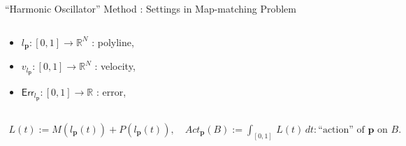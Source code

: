 \documentclass[aspectratio=169, bigfiles]{beamer}
\newcommand{\err}{\mathsf{Err}}
\newcommand{\R}{\mathbb{R}}
\begin{document}
\begin{frame}{``Harmonic Oscillator'' Method : Settings in Map-matching Problem}
\begin{columns}[t]
\begin{column}{0.5\textwidth}
\begin{center}
\begin{tikzpicture}
    \end{tikzpicture}
\end{center}
\vspace{-3mm}
\begin{itemize}
    \item
    $l_{\textbf{p}}:[0,1]\to\R^{N}$ : polyline,
    \item
    $v_{l_{\textbf{p}}}:[0,1]\to\R^{N}$ : velocity,
    \item
    $\err_{l_{\textbf{p}}}:[0,1]\to\R$ : error,
\end{itemize}
\end{column}
\end{columns}
\begin{tcolorbox}[colframe=yellow,
colback=yellow!10!white,
colbacktitle=yellow!40!white,
coltitle=black, fonttitle=\bfseries]
\vspace{-6.5mm}
    \begin{align*}
        L(t):=M(l_{\textbf{p}}(t))+P(l_{\textbf{p}}(t)),\quad Act_{\textbf{p}}(B) := \int_{[0,1]}\,L(t)\,dt : \text{``action'' of $\mathbf{p}$ on $B$}.
    \end{align*}
    \vspace{-7mm}
\end{tcolorbox}
\end{frame}
\end{document}
